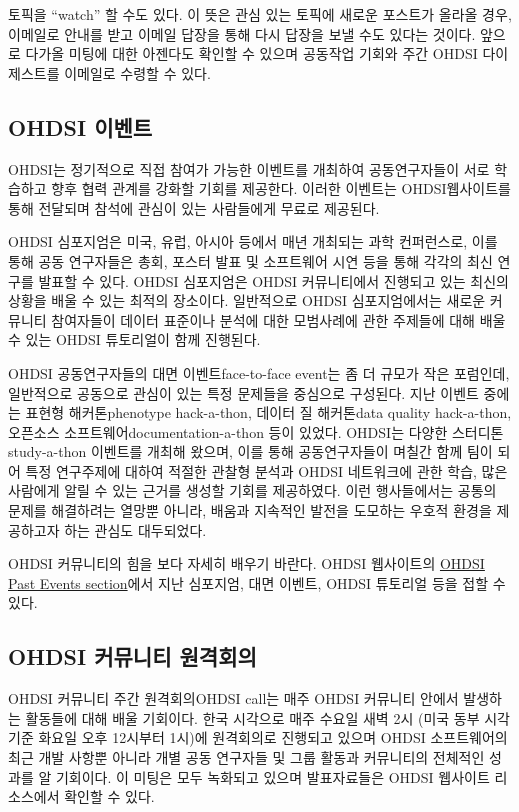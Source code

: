 \documentclass[11pt]{book}
\theoremstyle{definition}
\theoremstyle{definition}
\theoremstyle{definition}
\theoremstyle{remark}
\let\BeginKnitrBlock\begin \let\EndKnitrBlock\end
\begin{document}
\BeginKnitrBlock{rmdimportant}
토픽을 ``watch'' 할 수도 있다. 이 뜻은 관심 있는 토픽에 새로운 포스트가
올라올 경우, 이메일로 안내를 받고 이메일 답장을 통해 다시 답장을 보낼
수도 있다는 것이다. 앞으로 다가올 미팅에 대한 아젠다도 확인할 수 있으며
공동작업 기회와 주간 OHDSI 다이제스트를 이메일로 수령할 수 있다.
\EndKnitrBlock{rmdimportant}

\hypertarget{ohdsi-}{\subsection{OHDSI 이벤트}\label{ohdsi-}}

OHDSI는 정기적으로 직접 참여가 가능한 이벤트를 개최하여 공동연구자들이
서로 학습하고 향후 협력 관계를 강화할 기회를 제공한다. 이러한 이벤트는
OHDSI웹사이트를 통해 전달되며 참석에 관심이 있는 사람들에게 무료로
제공된다.

OHDSI 심포지엄은 미국, 유럽, 아시아 등에서 매년 개최되는 과학
컨퍼런스로, 이를 통해 공동 연구자들은 총회, 포스터 발표 및 소프트웨어
시연 등을 통해 각각의 최신 연구를 발표할 수 있다. OHDSI 심포지엄은 OHDSI
커뮤니티에서 진행되고 있는 최신의 상황을 배울 수 있는 최적의 장소이다.
일반적으로 OHDSI 심포지엄에서는 새로운 커뮤니티 참여자들이 데이터
표준이나 분석에 대한 모범사례에 관한 주제들에 대해 배울 수 있는 OHDSI
튜토리얼이 함께 진행된다.

OHDSI 공동연구자들의 대면 이벤트face-to-face event는 좀 더 규모가 작은
포럼인데, 일반적으로 공동으로 관심이 있는 특정 문제들을 중심으로
구성된다. 지난 이벤트 중에는 표현형 해커톤phenotype hack-a-thon, 데이터
질 해커톤data quality hack-a-thon, 오픈소스
소프트웨어documentation-a-thon 등이 있었다. OHDSI는 다양한
스터디톤study-a-thon 이벤트를 개최해 왔으며, 이를 통해 공동연구자들이
며칠간 함께 팀이 되어 특정 연구주제에 대하여 적절한 관찰형 분석과 OHDSI
네트워크에 관한 학습, 많은 사람에게 알릴 수 있는 근거를 생성할 기회를
제공하였다. 이런 행사들에서는 공통의 문제를 해결하려는 열망뿐 아니라,
배움과 지속적인 발전을 도모하는 우호적 환경을 제공하고자 하는 관심도
대두되었다.

OHDSI 커뮤니티의 힘을 보다 자세히 배우기 바란다. OHDSI 웹사이트의
\href{https://www.ohdsi.org/past-events/}{OHDSI Past Events section}에서
지난 심포지엄, 대면 이벤트, OHDSI 튜토리얼 등을 접할 수 있다.

\subsection{OHDSI 커뮤니티 원격회의}\label{ohdsi--}

OHDSI 커뮤니티 주간 원격회의OHDSI call는 매주 OHDSI 커뮤니티 안에서
발생하는 활동들에 대해 배울 기회이다. 한국 시각으로 매주 수요일 새벽 2시
(미국 동부 시각 기준 화요일 오후 12시부터 1시)에 원격회의로 진행되고
있으며 OHDSI 소프트웨어의 최근 개발 사항뿐 아니라 개별 공동 연구자들 및
그룹 활동과 커뮤니티의 전체적인 성과를 알 기회이다. 이 미팅은 모두
녹화되고 있으며 발표자료들은 OHDSI 웹사이트 리소스에서 확인할 수 있다.
\end{document}
